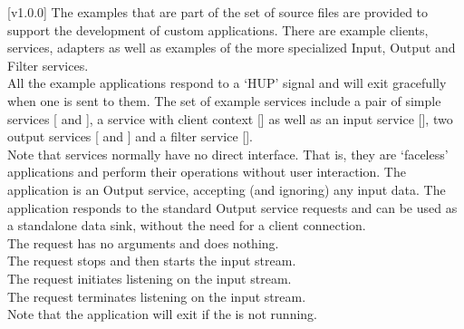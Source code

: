 [v1.0.0]
The examples that are part of the \mplusm{} set of source files are provided to support
the development of custom applications.
There are example clients, services, adapters as well as examples of the more specialized
Input, Output and Filter services.\\

All the example applications respond to a `HUP' signal and will exit gracefully when one
is sent to them.
The set of example services include a pair of simple services
[ and
], a service with client context
[] as well as an input service
[], two output services
[ and
] and a filter service
[].\\

Note that services normally have no direct interface.
That is, they are `faceless' applications and perform their operations without user
interaction.
The  application is an Output
service, accepting (and ignoring) any input data.
The application responds to the standard Output service requests and can be used as a
standalone data sink, without the need for a client connection.\\

The  request has no arguments and
does nothing.\\

The  request stops and then
starts the input stream.\\

The  request initiates listening
on the input stream.\\

The  request terminates listening
on the input stream.\\

Note that the application will exit if the
 is not running.\\

